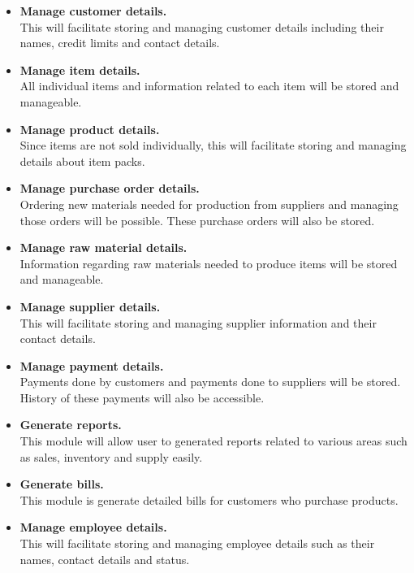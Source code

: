 \documentclass[12pt]{report}
\begin{document}
\begin{itemize}
	\item {\bf{Manage customer details.}}\\
	      This will facilitate storing and managing customer details including their names, credit limits and contact details.

	\item {\bf{Manage item details.}}\\
	      All individual items and information related to each item will be stored and manageable.

	\item {\bf{Manage product details.}}\\
	      Since items are not sold individually, this will facilitate storing and managing details about item packs.

	\item {\bf{Manage purchase order details.}}\\
	      Ordering new materials needed for production from suppliers and managing those orders will be possible. These purchase orders
	      will also be stored.

	\item {\bf{Manage raw material details.}}\\
	      Information regarding raw materials needed to produce items will be stored and manageable.

	\item {\bf{Manage supplier details.}}\\
	      This will facilitate storing and managing supplier information and their contact details.

	\item {\bf{Manage payment details.}}\\
	      Payments done by customers and payments done to suppliers will be stored. History of these payments will also be accessible.
	\item {\bf{Generate reports.}}\\
	      This module will allow user to generated reports related to various areas such as sales, inventory and supply easily.

	\item {\bf{Generate bills.}}\\
	      This module is generate detailed bills for customers who purchase products.

	\item {\bf{Manage employee details.}}\\
	      This will facilitate storing and managing employee details such as their names, contact details and status.


\end{itemize}
\end{document}
